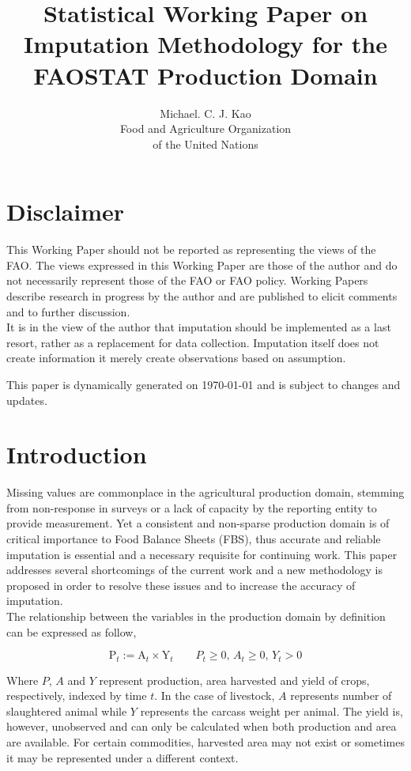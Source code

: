 \documentclass[nojss]{jss}\usepackage[]{graphicx}\usepackage[]{color}
\title{\bf Statistical Working Paper on Imputation Methodology for the
  FAOSTAT Production Domain}
\author{Michael. C. J. Kao\\ Food and Agriculture Organization \\ of
  the United Nations}
\begin{document}
\section*{Disclaimer}
This Working Paper should not be reported as representing the views of
the FAO. The views expressed in this Working Paper are those of the
author and do not necessarily represent those of the FAO or FAO
policy. Working Papers describe research in progress by the author and
are published to elicit comments and to further discussion.\\

It is in the view of the author that imputation should be implemented
as a last resort, rather as a replacement for data
collection. Imputation itself does not create information it merely
create observations based on assumption. 

This paper is dynamically generated on \today{} and is subject to
changes and updates.

\section{Introduction}
Missing values are commonplace in the agricultural production domain,
stemming from non-response in surveys or a lack of capacity by the
reporting entity to provide measurement. Yet a consistent and
non-sparse production domain is of critical importance to Food Balance
Sheets (FBS), thus accurate and reliable imputation is essential and a
necessary requisite for continuing work. This paper addresses several
shortcomings of the current work and a new methodology is proposed in
order to resolve these issues and to increase the accuracy of
imputation.\\

The relationship between the variables in the production domain by
definition can be expressed as follow,

\begin{equation}
  \label{eq:identity}
  \text{P}_t := \text{A}_t \times \text{Y}_t \quad\quad P_t \ge 0,\, A_t
  \ge 0,\, Y_t > 0
\end{equation}


Where $P$, $A$ and $Y$ represent production, area harvested and yield
of crops, respectively, indexed by time $t$. In the case of livestock,
$A$ represents number of slaughtered animal while $Y$ represents the
carcass weight per animal. The yield is, however, unobserved and can
only be calculated when both production and area are available. For
certain commodities, harvested area may not exist or sometimes it may
be represented under a different context.\\
\end{document}
